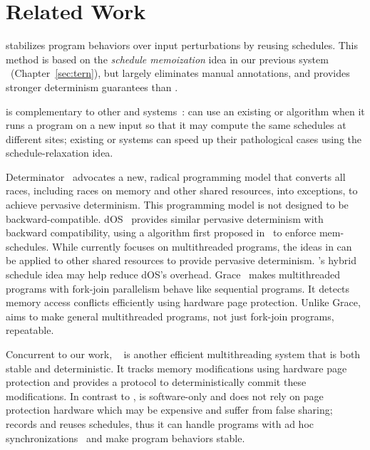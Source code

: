 \section{Related Work} \label{sec:peregrine-related}

\peregrine stabilizes program behaviors over input perturbations by reusing 
schedules. This method is based on the \emph{schedule memoization} idea in our 
previous system \tern~(Chapter~\ref{sec:tern}), but \peregrine largely 
eliminates manual annotations, and provides stronger determinism guarantees than 
\tern.

\peregrine is complementary to other \smt and \dmt 
systems~\cite{determinator:osdi10, dthreads:sosp11, cui:tern:osdi10, 
coredet:asplos10, kendo:asplos09, dmp:asplos09}: \peregrine can use an
existing \smt or \dmt algorithm when it runs a program on a new input
so that it may compute the same schedules at different sites;
existing \smt or \dmt systems can speed up their pathological cases
using the schedule-relaxation idea.

Determinator~\cite{determinator:osdi10}
advocates a new, radical programming model that converts all races,
including races on memory and other shared resources, into exceptions, to
achieve pervasive determinism. This programming model is not designed to
be backward-compatible. dOS~\cite{dos:osdi10} provides similar pervasive
determinism with backward compatibility, using a \dmt algorithm first
proposed in~\cite{dmp:asplos09} to enforce mem-schedules.  While \peregrine
currently focuses on multithreaded programs, the ideas in \peregrine can be
applied to other shared resources to provide pervasive determinism.
\peregrine's hybrid schedule idea may help reduce dOS's overhead.  
Grace~\cite{grace:oopsla09} makes multithreaded programs with fork-join 
parallelism behave like sequential programs.  It detects memory access 
conflicts efficiently using hardware page protection.  Unlike Grace, \peregrine 
aims to make general multithreaded programs, not just fork-join programs, 
repeatable.

Concurrent to our work, \dthreads~\cite{dthreads:sosp11} is another
efficient multithreading system that is both stable and deterministic. It 
tracks memory modifications using hardware page protection and provides a 
protocol to deterministically commit these modifications. In contrast to 
\dthreads, \peregrine is software-only and does not rely on page protection 
hardware which may be expensive and suffer from false sharing; \peregrine 
records and reuses schedules, thus it can handle programs with ad hoc 
synchronizations~\cite{syncfinder:osdi10} and make program behaviors stable.

